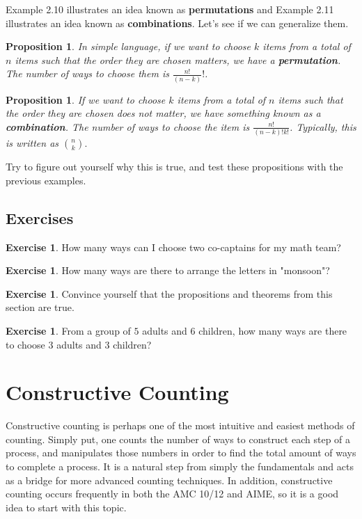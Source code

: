 \documentclass[letterpaper]{article}
\newtheorem{prop}[thm]{Proposition}
\theoremstyle{remark}
\theoremstyle{definition}
\newtheorem{exercise}[thm]{Exercise}
\begin{document}
Example 2.10 illustrates an idea known as \textbf{permutations} and Example 2.11 illustrates an idea known as \textbf{combinations}. Let's see if we can generalize them.

\begin{prop}
In simple language, if we want to choose $k$ items from a total of $n$ items such that the order they are chosen matters, we have a \textbf{permutation}. The number of ways to choose them is $\frac{n!}{(n-k)}!$.
\end{prop}

\begin{prop}
If we want to choose $k$ items from a total of $n$ items such that the order they are chosen does not matter, we have something known as a \textbf{combination}. The number of ways to choose the item is $\frac{n!}{(n-k)!k!}$. Typically, this is written as $\binom{n}{k}.$
\end{prop}

Try to figure out yourself why this is true, and test these propositions with the previous examples.

\subsection*{Exercises}

\begin{exercise}
How many ways can I choose two co-captains for my math team?
\end{exercise}

\begin{exercise}
How many ways are there to arrange the letters in "monsoon"?
\end{exercise}

\begin{exercise}
Convince yourself that the propositions and theorems from this section are true.
\end{exercise}

\begin{exercise}
From a group of $5$ adults and $6$ children, how many ways are there to choose $3$ adults and $3$ children?
\end{exercise}






\section{Constructive Counting}

Constructive counting is perhaps one of the most intuitive and easiest methods of counting. Simply put, one counts the number of ways to construct each step of a process, and manipulates those numbers in order to find the total amount of ways to complete a process. It is a natural step from simply the fundamentals and acts as a bridge for more advanced counting techniques. In addition, constructive counting occurs frequently in both the AMC 10/12 and AIME, so it is a good idea to start with this topic.
\end{document}
